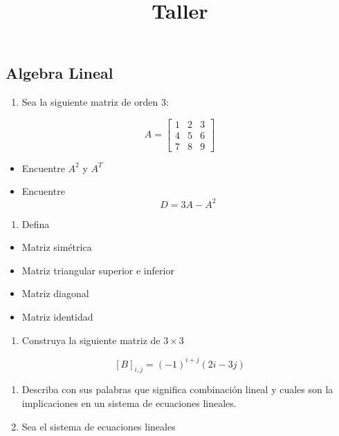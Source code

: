 \documentclass[
  letterpaper,
  DIV=11,
  numbers=noendperiod]{scrartcl}
\title{Taller}
\author{}
\date{}
\providecommand{\tightlist}{%
  \setlength{\itemsep}{0pt}\setlength{\parskip}{0pt}}\usepackage{longtable,booktabs,array}
\begin{document}
\maketitle


\subsection{Algebra Lineal}\label{algebra-lineal}

\begin{enumerate}
\def\labelenumi{\arabic{enumi}.}
\tightlist
\item
  Sea la siguiente matriz de orden 3:
\end{enumerate}

\[A= \begin{bmatrix} 1 & 2 & 3 \\ 4 & 5 & 6 \\ 7 & 8 & 9 \end{bmatrix} \]

\begin{itemize}
\item
  Encuentre \(A^2\) y \(A^T\)
\item
  Encuentre \[D=3A-A^2\]
\end{itemize}

\begin{enumerate}
\def\labelenumi{\arabic{enumi}.}
\setcounter{enumi}{1}
\tightlist
\item
  Defina
\end{enumerate}

\begin{itemize}
\item
  Matriz simétrica
\item
  Matriz triangular superior e inferior
\item
  Matriz diagonal
\item
  Matriz identidad
\end{itemize}

\begin{enumerate}
\def\labelenumi{\arabic{enumi}.}
\setcounter{enumi}{2}
\tightlist
\item
  Construya la siguiente matriz de \(3\times3\)
\end{enumerate}

\[[B]_{i,j}=(-1)^{i+j}(2i-3j)\]

\begin{enumerate}
\def\labelenumi{\arabic{enumi}.}
\setcounter{enumi}{3}
\item
  Describa con sus palabras que significa combinación lineal y cuales
  son la implicaciones en un sistema de ecuaciones lineales.
\item
  Sea el sistema de ecuaciones lineales
\end{enumerate}
\end{document}
